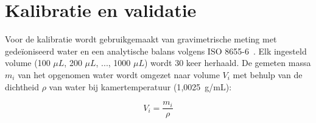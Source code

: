 \section{Kalibratie en validatie}
Voor de kalibratie wordt gebruikgemaakt van gravimetrische meting met gedeïoniseerd water en een analytische balans volgens ISO 8655-6\ \cite{RN50}.
Elk ingesteld volume (100 $\mu L$, 200 $\mu L$, ..., 1000 $\mu L$) wordt 30 keer herhaald. De gemeten massa $m_i$
van het opgenomen water wordt omgezet naar volume $V_i$ met behulp van de dichtheid $\rho$ van water bij kamertemperatuur (1{,}0025~g/mL):

\begin{equation} V_i = \frac{m_i}{\rho} \end{equation}

